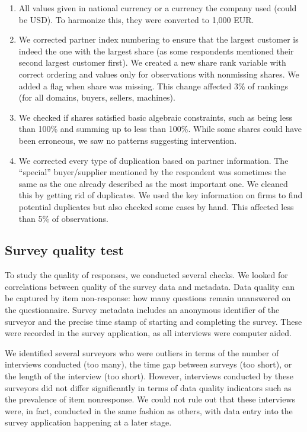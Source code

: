 \documentclass[final, dvipsnames, authoryear,12pt]{elsarticle}
\begin{document}
\begin{enumerate}
    \item All values given in national currency or a currency the company used (could be USD). To harmonize this, they were converted to 1,000 EUR. 
    
    \item We corrected partner index numbering to ensure that the largest customer is indeed the one with the largest share (as some respondents mentioned their second largest customer first). We created a new share rank variable with correct ordering and values only for observations with nonmissing shares. We added a flag when share was missing. This change affected 3\% of rankings (for all domains, buyers, sellers, machines). 
    
    \item We checked if shares satisfied basic algebraic constraints, such as being less than 100\% and summing up to less than 100\%. While some shares could have been erroneous, we saw no patterns suggesting intervention.
    
    \item We corrected every type of duplication based on partner information. The ``special'' buyer/supplier mentioned by the respondent was sometimes the same as the one already described as the most important one. We cleaned this by getting rid of duplicates. We used the key information on firms to find potential duplicates but also checked some cases by hand. This affected less than 5\% of observations.

\end{enumerate}

\subsection{Survey quality test}
To study the quality of responses, we conducted several checks. We looked for correlations between quality of the survey data and metadata. Data quality can be captured by item non-response: how many questions remain unanswered on the questionnaire. Survey metadata includes an anonymous identifier of the surveyor and the precise time stamp of starting and completing the survey. These were recorded in the survey application, as all interviews were computer aided. 

We identified several surveyors who were outliers in terms of the number of interviews conducted (too many), the time gap between surveys (too short), or the length of the interview (too short). However, interviews conducted by these surveyors did not differ significantly in terms of data quality indicators such as the prevalence of item nonresponse. We could not rule out that these interviews were, in fact, conducted in the same fashion as others, with data entry into the survey application happening at a later stage.
\end{document}
